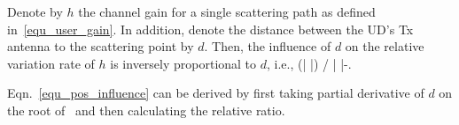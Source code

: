 \begin{corollary}
\label{corollary_1}
Denote by $h$ the channel gain for a single scattering path as defined in~\eqref{equ_user_gain}.
In addition, denote the distance between the UD's Tx antenna to the scattering point by $d$.
Then, the influence of $d$ on the relative variation rate of $h$ is inversely proportional to $d$, i.e.,
\beq
\label{equ_pos_influence}
\Big(\Big| \Big|\Big) /  \Big| \Big|\approx -.
\eeq
\end{corollary}
\begin{IEEEproof}
Eqn.~\eqref{equ_pos_influence} can be derived by first taking partial derivative of $d$ on the root of~\cite[Eqn. (4)]{Hu2023Mobicom_Muse} and then calculating the relative ratio.
\end{IEEEproof}